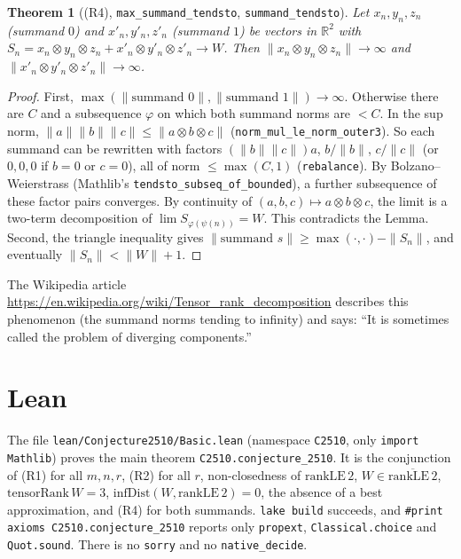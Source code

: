 \documentclass[11pt]{article}
\newtheorem{theorem}{Theorem}
\theoremstyle{definition}
\newcommand{\R}{\mathbb{R}}
\begin{document}
\begin{theorem}[(R4), \texttt{max\_summand\_tendsto}, \texttt{summand\_tendsto}]
Let $x_n,y_n,z_n$ (summand $0$) and $x'_n,y'_n,z'_n$ (summand $1$) be vectors in $\R^2$
with $S_n=x_n\otimes y_n\otimes z_n+x'_n\otimes y'_n\otimes z'_n\to W$. Then
$\|x_n\otimes y_n\otimes z_n\|\to\infty$ and $\|x'_n\otimes y'_n\otimes z'_n\|\to\infty$.
\end{theorem}
\begin{proof}
First, $\max(\|\text{summand }0\|,\|\text{summand }1\|)\to\infty$. Otherwise there are $C$
and a subsequence $\varphi$ on which both summand norms are $<C$. In the sup norm,
$\|a\|\|b\|\|c\|\le\|a\otimes b\otimes c\|$ (\texttt{norm\_mul\_le\_norm\_outer3}). So each
summand can be rewritten with factors $(\|b\|\|c\|)a$, $b/\|b\|$, $c/\|c\|$ (or $0,0,0$ if
$b=0$ or $c=0$), all of norm $\le\max(C,1)$ (\texttt{rebalance}). By Bolzano--Weierstrass
(Mathlib's \texttt{tendsto\_subseq\_of\_bounded}), a further subsequence of these factor
pairs converges. By continuity of $(a,b,c)\mapsto a\otimes b\otimes c$, the limit is a
two-term decomposition of $\lim S_{\varphi(\psi(n))}=W$. This contradicts the Lemma.
Second, the triangle inequality gives
$\|\text{summand }s\|\ge\max(\cdot,\cdot)-\|S_n\|$, and eventually $\|S_n\|<\|W\|+1$.
\end{proof}
The Wikipedia article \url{https://en.wikipedia.org/wiki/Tensor_rank_decomposition} describes
this phenomenon (the summand norms tending to infinity) and says: ``It is sometimes called
the problem of diverging components.''

\section*{Lean}
The file \texttt{lean/Conjecture2510/Basic.lean} (namespace \texttt{C2510}, only
\texttt{import Mathlib}) proves the main theorem \texttt{C2510.conjecture\_2510}. It is the
conjunction of (R1) for all $m,n,r$, (R2) for all $r$, non-closedness of
$\mathrm{rankLE}\,2$, $W\in\overline{\mathrm{rankLE}\,2}$, $\mathrm{tensorRank}\,W=3$,
$\mathrm{infDist}(W,\mathrm{rankLE}\,2)=0$, the absence of a best approximation, and (R4)
for both summands. \texttt{lake build} succeeds, and \texttt{\#print axioms
C2510.conjecture\_2510} reports only \texttt{propext}, \texttt{Classical.choice} and
\texttt{Quot.sound}. There is no \texttt{sorry} and no \texttt{native\_decide}.
\end{document}
